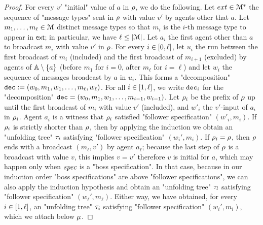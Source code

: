 \begin{proof}
	For every $v'$ "initial" value of $a$ in $\rho$, we do the following.  
	Let $\mathsf{ext} \in \messages^*$ the sequence of "message types" sent in $\rho$ with value $v'$ by agents other that $a$. Let $m_1, \dots, m_\ell \in \mathcal{M}$ distinct message types so that $m_i$ is the $i$-th message type to appear in $\mathsf{ext}$; in particular, we have $\ell \leq |\mathcal{M}|$. 
	Let $a_i$ the first agent other than $a$ to broadcast $m_i$ with value $v'$ in $\rho$. For every $i \in [0,\ell]$, let $u_i$ the run between the first broadcast of $m_i$ (included) and the first broadcast of $m_{i+1}$ (excluded) by agents of $\mathbb{A} \setminus \{a\}$ (before $m_1$ for $i=0$, after $m_\ell$ for $i = \ell$) and let $w_i$ the sequence of messages broadcast by $a$ in $u_i$. This forms a "decomposition" $\mathtt{dec} := (w_0, m_1, w_1, \ldots, m_\ell, w_\ell)$.
	For all $i \in [1,\ell]$, we write $\mathtt{dec}_i$ for the "decomposition" $\mathtt{dec} = (w_0, m_1, w_1, \ldots, m_{i-1}, w_{i-1})$.   Let $\rho_i$ be the prefix of $\rho$ up until the first broadcast of $m_i$ with value $v'$ (included), and $w'_i$ the $v'$-input of $a_i$ in $\rho_i$. Agent $a_i$ is a witness that $\rho_i$ satisfied "follower specification" $(w'_i, m_i)$. 
	If $\rho_i$ is strictly shorter than $\rho$, then by applying the induction we obtain an "unfolding tree" $\tau_i$ satisfying "follower specification" $(w_i', m_i)$. If $\rho_i = \rho$, then $\rho$ ends with a broadcast $(m_\ell,v')$ by agent $a_\ell$; because the last step of $\rho$ is a broadcast with value $v$, this implies $v = v'$ therefore $v$ is initial for $a$, which may happen only when $\spec$ is a "boss specification". In that case, because in our induction order "boss specifications" are above "follower specifications", we can also apply the induction hypothesis and obtain an "unfolding tree" $\tau_l$ satisfying "follower specification" $(w_\ell', m_\ell)$. Either way, we have obtained, for every $i \in [1,\ell]$, an "unfolding tree" $\tau_i$ satisfying "follower specification" $(w_i', m_i)$, which we attach below $\mu$. 
	

\end{proof}
